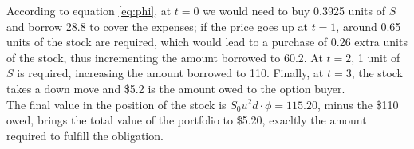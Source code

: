 \documentclass[../TGMAFFIRO.tex]{subfiles}
\begin{document}
According to equation \ref{eq:phi}, at $t=0$ we would need to buy 0.3925 units of $S$ and borrow 28.8 to cover the expenses; if the price goes up at $t=1$, around 0.65 units of the stock are required, which would lead to a purchase of 0.26 extra units of the stock, thus incrementing the amount borrowed to 60.2. At $t=2$, 1 unit of $S$ is required, increasing the amount borrowed to 110. Finally, at $t=3$, the stock takes a down move and \$5.2 is the amount owed to the option buyer. \\

The final value in the position of the stock is $S_0 u ^ 2 d \cdot \phi = 115.20$, minus the \$110 owed, brings the total value of the portfolio to \$5.20, exacltly the amount required to fulfill the obligation.
\end{document}
